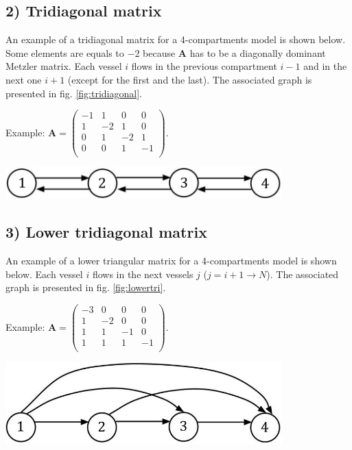 \subsection*{2) Tridiagonal matrix}
An example of a tridiagonal matrix for a 4-compartments model is shown below. Some elements are equals to $-2$ because $\mathbf{A}$ has to be a diagonally dominant Metzler matrix. Each vessel $i$ flows in the previous compartment $i-1$ and in the next one $i+1$ (except for the first and the last). The associated graph is presented in fig. \ref{fig:tridiagonal}.\\

\begin{minipage}[l]{0.5\linewidth}
	Example: $
	\mathbf{A}=\begin{pmatrix}
	-1 & 1 & 0 & 0\\
	1 & -2 & 1 & 0\\
	0 & 1 & -2 & 1\\
	0 & 0 & 1 & -1\\
	\end{pmatrix}$.
\end{minipage}
\begin{minipage}[r]{0.5\textwidth}
	\centering
	\includegraphics[width=0.8\textwidth]{tridiag}
	\label{fig:tridiagonal}
\end{minipage}

\subsection*{3) Lower tridiagonal matrix}
An example of a lower triangular matrix for a 4-compartments model is shown below. Each vessel $i$ flows in the next vessels $j$ ($j=i+1\rightarrow N$). The associated graph is presented in fig. \ref{fig:lowertri}.\\

\begin{minipage}[l]{0.5\linewidth}
	Example: $
	\mathbf{A}=\begin{pmatrix}
	-3 & 0 & 0 & 0\\
	1 & -2 & 0 & 0\\
	1 & 1 & -1 & 0\\
	1 & 1 & 1 & -1\\
	\end{pmatrix}$.
\end{minipage}
\begin{minipage}[r]{0.5\textwidth}
	\centering
	\includegraphics[width=0.8\textwidth]{lowertri}
	\label{fig:lowertri}
\end{minipage}

